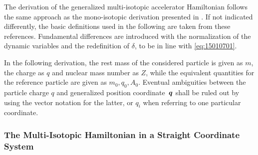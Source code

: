 The derivation of the generalized multi-isotopic accelerator Hamiltonian follows the same approach as the mono-isotopic derivation presented in \cite{DESY-85-084,DESY-87-036,ProceedingsCAS1995}. If not indicated differently, the basic definitions used in the following are taken from these references. Fundamental differences are introduced with the normalization of the dynamic variables and the redefinition of $\delta$, to be in line with \eqref{eq:15010701}.

In the following derivation, the rest mass of the considered particle is given as $m$, the charge as $q$ and nuclear mass number as $Z$, while the equivalent quantities for the reference particle are given as $m_0,q_0,A_0$. Eventual ambiguities between the particle charge $q$ and generalized position \mbox{coordinate $\boldsymbol{q}$} shall be ruled out by using the vector notation for the latter, or $q_i$ when referring to one particular coordinate.

\subsubsection{The Multi-Isotopic Hamiltonian in a Straight Coordinate System} \label{chap:multiham}

